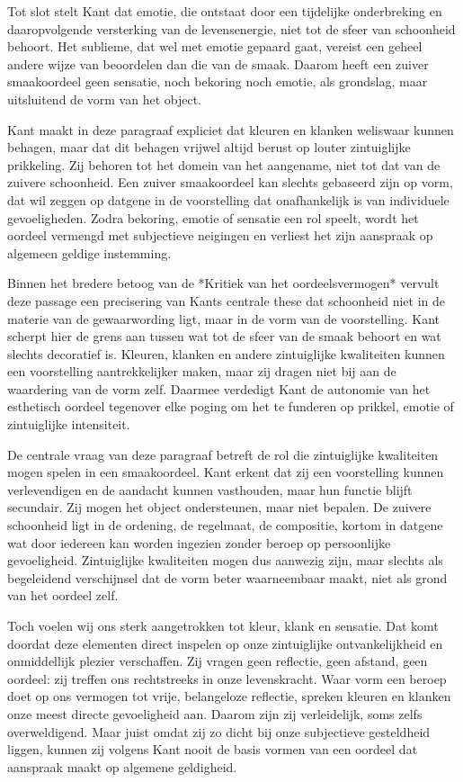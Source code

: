 \begin{mdframed}[leftmargin=0pt,rightmargin=0pt,backgroundcolor=blue!6,linecolor=white,innertopmargin=6pt,innerbottommargin=6pt]
Tot slot stelt Kant dat emotie, die ontstaat door een tijdelijke onderbreking en daaropvolgende versterking van de levensenergie, niet tot de sfeer van schoonheid behoort. Het sublieme, dat wel met emotie gepaard gaat, vereist een geheel andere wijze van beoordelen dan die van de smaak. Daarom heeft een zuiver smaakoordeel geen sensatie, noch bekoring noch emotie, als grondslag, maar uitsluitend de vorm van het object.

\bigskip
Kant maakt in deze paragraaf expliciet dat kleuren en klanken weliswaar kunnen behagen, maar dat dit behagen vrijwel altijd berust op louter zintuiglijke prikkeling. Zij behoren tot het domein van het aangename, niet tot dat van de zuivere schoonheid. Een zuiver smaakoordeel kan slechts gebaseerd zijn op vorm, dat wil zeggen op datgene in de voorstelling dat onafhankelijk is van individuele gevoeligheden. Zodra bekoring, emotie of sensatie een rol speelt, wordt het oordeel vermengd met subjectieve neigingen en verliest het zijn aanspraak op algemeen geldige instemming.

Binnen het bredere betoog van de *Kritiek van het oordeelsvermogen* vervult deze passage een precisering van Kants centrale these dat schoonheid niet in de materie van de gewaarwording ligt, maar in de vorm van de voorstelling. Kant scherpt hier de grens aan tussen wat tot de sfeer van de smaak behoort en wat slechts decoratief is. Kleuren, klanken en andere zintuiglijke kwaliteiten kunnen een voorstelling aantrekkelijker maken, maar zij dragen niet bij aan de waardering van de vorm zelf. Daarmee verdedigt Kant de autonomie van het esthetisch oordeel tegenover elke poging om het te funderen op prikkel, emotie of zintuiglijke intensiteit.

De centrale vraag van deze paragraaf betreft de rol die zintuiglijke kwaliteiten mogen spelen in een smaakoordeel. Kant erkent dat zij een voorstelling kunnen verlevendigen en de aandacht kunnen vasthouden, maar hun functie blijft secundair. Zij mogen het object ondersteunen, maar niet bepalen. De zuivere schoonheid ligt in de ordening, de regelmaat, de compositie, kortom in datgene wat door iedereen kan worden ingezien zonder beroep op persoonlijke gevoeligheid. Zintuiglijke kwaliteiten mogen dus aanwezig zijn, maar slechts als begeleidend verschijnsel dat de vorm beter waarneembaar maakt, niet als grond van het oordeel zelf.

Toch voelen wij ons sterk aangetrokken tot kleur, klank en sensatie. Dat komt doordat deze elementen direct inspelen op onze zintuiglijke ontvankelijkheid en onmiddellijk plezier verschaffen. Zij vragen geen reflectie, geen afstand, geen oordeel: zij treffen ons rechtstreeks in onze levenskracht. Waar vorm een beroep doet op ons vermogen tot vrije, belangeloze reflectie, spreken kleuren en klanken onze meest directe gevoeligheid aan. Daarom zijn zij verleidelijk, soms zelfs overweldigend. Maar juist omdat zij zo dicht bij onze subjectieve gesteldheid liggen, kunnen zij volgens Kant nooit de basis vormen van een oordeel dat aanspraak maakt op algemene geldigheid.

\end{mdframed}

